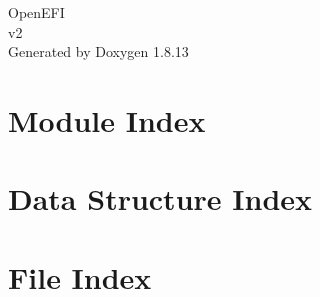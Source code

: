 \documentclass[twoside]{book}
\newcommand{\+}{\discretionary{\mbox{\scriptsize$\hookleftarrow$}}{}{}}
\newcommand{\clearemptydoublepage}{%
  \newpage{\pagestyle{empty}\cleardoublepage}%
}
\begin{document}
\hypersetup{pageanchor=false,
             bookmarksnumbered=true,
             pdfencoding=unicode
            }
\begin{titlepage}
\vspace*{7cm}
\begin{center}%
{\Large Open\+E\+FI \\[1ex]\large v2 }\\
\vspace*{1cm}
{\large Generated by Doxygen 1.8.13}\\
\end{center}
\end{titlepage}
\clearemptydoublepage
{}
\tableofcontents
\clearemptydoublepage
{}
\hypersetup{pageanchor=true}

\chapter{Module Index}

\chapter{Data Structure Index}

\chapter{File Index}

\end{document}
